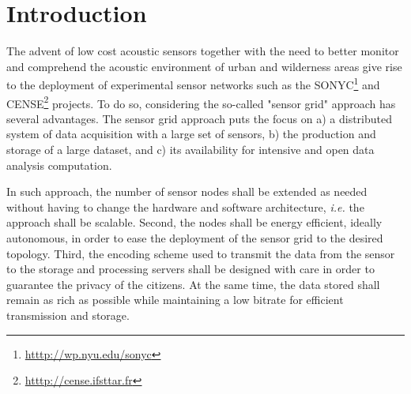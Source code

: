\documentclass[sensors,article,submit,moreauthors,pdftex,10pt,a4paper]{mdpi}
\begin{document}


\section{Introduction}

The advent of low cost acoustic sensors together with the need to better monitor and comprehend the acoustic environment of urban and wilderness areas give rise to the deployment of experimental sensor networks such as the SONYC\footnote{\url{htttp://wp.nyu.edu/sonyc}} \cite{mydlarz2017implementation} and CENSE\footnote{\url{htttp://cense.ifsttar.fr}} \cite{picault2017} projects. To do so, considering the so-called "sensor grid" approach  \cite{lim2005sensor,tham2005sensorgrid} has several advantages. The sensor grid approach puts the focus on a) a distributed system of data acquisition with a large set of sensors, b) the production and storage of a large dataset, and c) its availability for intensive and open data analysis computation.

In such approach, the number of sensor nodes shall be extended as needed without having to change the hardware and software architecture, \textit{i.e.} the approach shall be scalable. Second, the nodes shall be energy efficient, ideally autonomous, in order to ease the deployment of the sensor grid to the desired topology. Third, the encoding scheme used to transmit the data from the sensor to the storage and processing servers shall be designed with care in order to guarantee the privacy of the citizens. At the same time, the data stored shall remain as rich as possible while maintaining a low bitrate for efficient transmission and storage.
\end{document}
